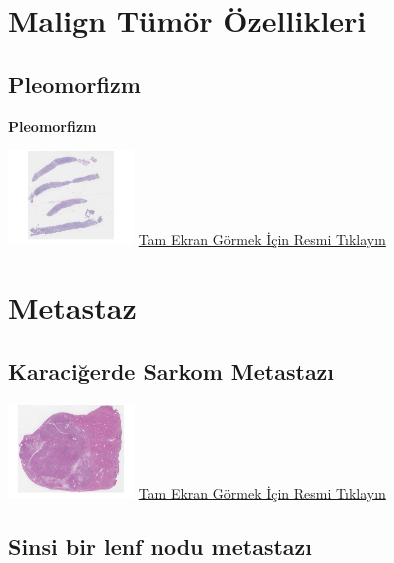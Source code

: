 \documentclass[
  letterpaper,
  DIV=11,
  numbers=noendperiod]{scrreprt}
\begin{document}
\hypertarget{sec-malign-tumor-ozellikleri}{%
\chapter{Malign Tümör Özellikleri}\label{sec-malign-tumor-ozellikleri}}

\hypertarget{sec-pleomorfizm}{%
\section{Pleomorfizm}\label{sec-pleomorfizm}}

\textbf{Pleomorfizm}

\href{https://images.patolojiatlasi.com/pleomorphism/HE.html}{\includegraphics[width=0.25\textwidth,height=\textheight]{./screenshots/thumbnail_pleomorphism.png}}
\href{https://images.patolojiatlasi.com/pleomorphism/HE.html}{Tam Ekran
Görmek İçin Resmi Tıklayın}

\hypertarget{sec-metastaz}{%
\chapter{Metastaz}\label{sec-metastaz}}

\hypertarget{sec-karaciger-sarkom-metastaz}{%
\section{Karaciğerde Sarkom
Metastazı}\label{sec-karaciger-sarkom-metastaz}}

\href{https://images.patolojiatlasi.com/metastaticsarcoma/HE.html}{\includegraphics[width=0.25\textwidth,height=\textheight]{./screenshots/thumbnail_metastaticsarcoma.png}}
\href{https://images.patolojiatlasi.com/metastaticsarcoma/HE.html}{Tam
Ekran Görmek İçin Resmi Tıklayın}

\hypertarget{sec-sinsi-lenf-nodu-metastazi}{%
\section{Sinsi bir lenf nodu
metastazı}\label{sec-sinsi-lenf-nodu-metastazi}}
\end{document}
